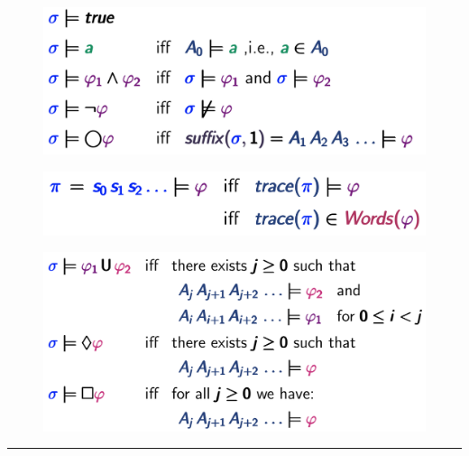 \documentclass[a4paper, notitlepage, 9pt]{extreport}
\begin{document}
\begin{multicols}{2}
	\begin{figure}[H]
		\centering
		\includegraphics[scale=0.18]{A1}
	\end{figure}
	\begin{figure}[H]
		\centering
		\includegraphics[scale=0.17]{A3}
	\end{figure}
	\columnbreak
	\begin{figure}[H]
		\centering
		\includegraphics[scale=0.21]{A2}
	\end{figure}
\end{multicols}

\hrule
\end{document}
